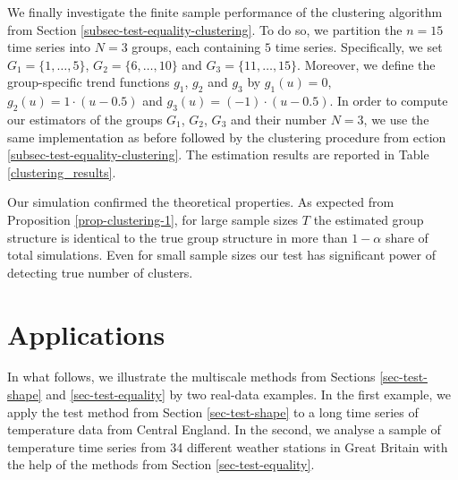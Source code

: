 We finally investigate the finite sample performance of the clustering algorithm from Section \ref{subsec-test-equality-clustering}. To do so, we partition the $n = 15$ time series into $N=3$ groups, each containing $5$ time series. Specifically, we set $G_1 = \{1,\ldots,5\}$, $G_2 = \{6,\ldots,10\}$ and $G_3 =  \{11,\ldots,15\}$. Moreover, we define the group-specific trend functions $g_1$, $g_2$ and $g_3$ by $g_1(u) = 0$, $g_2(u) = 1 \cdot (u - 0.5)$ and $g_3(u) =  (- 1) \cdot (u - 0.5)$. In order to compute our estimators of the groups $G_1$, $G_2$, $G_3$ and their number $N = 3$, we use the same implementation as before followed by the clustering procedure from ection \ref{subsec-test-equality-clustering}. The estimation results are reported in Table \ref{clustering_results}. 


Our simulation confirmed the theoretical properties. As expected from Proposition \ref{prop-clustering-1}, for large sample sizes $T$ the estimated group structure is identical to the true group structure in more than $1 - \alpha$ share of total simulations. Even for small sample sizes our test has significant power of detecting true number of clusters.


\section{Applications}\label{sec-data}

In what follows, we illustrate the multiscale methods from Sections \ref{sec-test-shape} and \ref{sec-test-equality} by two real-data examples. In the first example, we apply the test method from Section \ref{sec-test-shape} to a long time series of temperature data from Central England. In the second, we analyse a sample of temperature time series from 34 different weather stations in Great Britain with the help of the methods from Section \ref{sec-test-equality}. 


